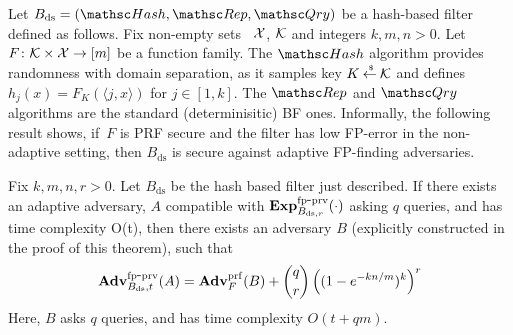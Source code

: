\newcommand{\FK}{F_K(\langle j,x \rangle)}
\newcommand{\rhoK}{\rho(\langle j,x \rangle)}
\newcommand{\OK}{\calO(\langle j,x \rangle)}

Let $B_{\mathrm{ds}}=(\Hash,\Rep,\Qry)$ be a hash-based filter defined as follows. Fix non-empty sets ~${\cal X}$, ${\cal K}$ and integers $k,m,n>0$.  Let $F\colon\mathcal{K} \times {\cal X} \to [m]$ be a function family.  The $\Hash$ algorithm provides randomness with domain separation, as it samples key $K {\:\stackrel{{\scriptscriptstyle \hspace{0.2em}\$}} {\leftarrow}\:} \mathcal{K}$ and defines $h_j(x) = \FK $ for $j \in [1,k]$.  The $\Rep$ and $\Qry$ algorithms are the standard (determinisitic) BF ones. Informally, the following result shows, if~$F$ is PRF secure and the filter has low FP-error in the non-adaptive setting, then $B_{\mathrm{ds}}$ is secure against adaptive FP-finding adversaries.

\begin{theorem}\label{thm2}
Fix $k,m,n,r >0$. Let $B_{\mathrm{ds}}$ be the hash based filter just described. If there exists an adaptive adversary, $A$ compatible with $\mathrm{\mathbf{Exp}}^{\mathrm{fp\mbox{-}prv}}_{B_{\mathrm{ds},r}}(\cdot)$ asking $q$ queries, and has time complexity O(t), then there exists an adversary $B$ (explicitly constructed in the proof of this theorem), such that 
\[
\mathrm{\mathbf{Adv}}^{\mathrm{fp\mbox{-}prv}}_{B_\mathrm{ds},t}(A) =  \mathbf{Adv}^{\mathrm{prf}}_{F}(B)  + {\dbinom{q}{r}} \left( (1-e^{-kn/m})^k  \right)^r
\]
Here, $B$ asks $q$ queries, and has time complexity $O(t+qm)$.
\end{theorem}

